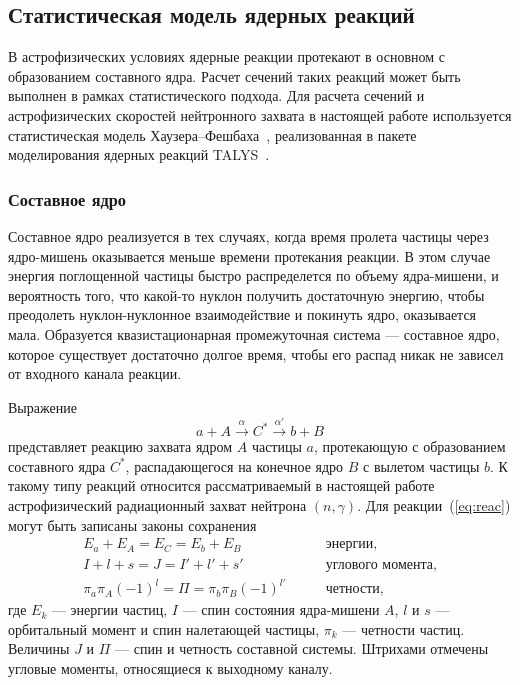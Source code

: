 \subsection{Статистическая модель ядерных реакций}


В астрофизических условиях ядерные реакции протекают в основном с образованием составного ядра. Расчет сечений таких реакций может быть выполнен в рамках статистического подхода. Для расчета сечений и астрофизических скоростей нейтронного захвата в настоящей работе используется статистическая модель Хаузера--Фешбаха~\cite{hauser1952}, реализованная в пакете моделирования ядерных реакций TALYS~\cite{koning2019}.

\subsubsection{Составное ядро}
Составное ядро реализуется в тех случаях, когда время пролета частицы через ядро-мишень оказывается меньше времени протекания реакции. В этом случае энергия поглощенной частицы быстро распределется по объему ядра-мишени, и вероятность того, что какой-то нуклон получить достаточную энергию, чтобы преодолеть нуклон-нуклонное взаимодействие и покинуть ядро, оказывается мала. Образуется квазистационарная промежуточная система --- составное ядро, которое существует достаточно долгое время, чтобы его распад никак не зависел от входного канала реакции.

Выражение
\begin{equation}
a + A \xrightarrow{\alpha} C^* \xrightarrow{\alpha'} b + B
\label{eq:reac}
\end{equation}
представляет реакцию захвата ядром $A$ частицы $a$, протекающую с образованием составного ядра $C^*$, распадающегося на конечное ядро $B$ с вылетом частицы $b$. К такому типу реакций относится рассматриваемый в настоящей работе астрофизический радиационный захват нейтрона $(n,\gamma)$. Для реакции~(\ref{eq:reac}) могут быть записаны законы сохранения
\begin{equation}
\begin{aligned}
E_a + E_A = E_C = E_b + E_B& \qquad \text{энергии,}\\
I + l + s = J = I' + l' + s'& \qquad \text{углового момента,}\\
\pi_a \pi_A (-1)^l = \Pi = \pi_b \pi_B (-1)^{l'}& \qquad \text{четности,}
\end{aligned}
\end{equation}
где $E_k$ --- энергии частиц, $I$ --- спин состояния ядра-мишени $A$, $l$ и $s$ --- орбитальный момент и спин налетающей частицы, $\pi_k$ --- четности частиц. Величины $J$ и $\Pi$ --- спин и четность составной системы. Штрихами отмечены угловые моменты, относящиеся к выходному каналу.

